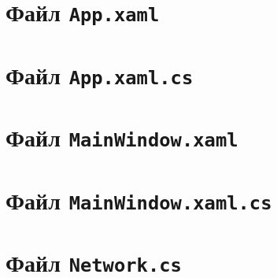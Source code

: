 \documentclass[a4paper,12pt]{article}
\begin{document}
\section{Файл \texttt{App.xaml}}

\section{Файл \texttt{App.xaml.cs}}

\section{Файл \texttt{MainWindow.xaml}}

\section{Файл \texttt{MainWindow.xaml.cs}}

\section{Файл \texttt{Network.cs}}
\end{document}
